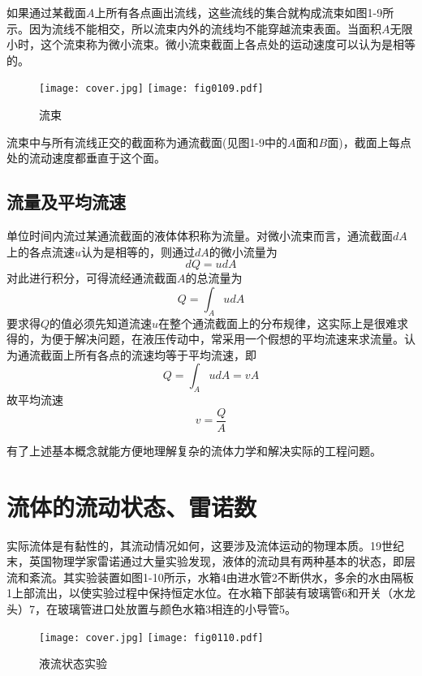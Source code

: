 如果通过某截面$A$上所有各点画出流线，这些流线的集合就构成流束如图1-9所示。因为流线不能相交，所以流束内外的流线均不能穿越流束表面。当面积$A$无限小时，这个流束称为微小流束。微小流束截面上各点处的运动速度可以认为是相等的。

    \begin{figure}[!hbt]
    \centering
    \ifOpenSource
    \texttt{[image: cover.jpg]}
    \else
    \texttt{[image: fig0109.pdf]}
    \fi
    \caption{流束}
    \label{fig:fig0109}
    \end{figure}

流束中与所有流线正交的截面称为通流截面(见图1-9中的$A$面和$B$面)，截面上每点处的流动速度都垂直于这个面。

\subsection{流量及平均流速}
单位时间内流过某通流截面的液体体积称为流量。对微小流束而言，通流截面$dA$上的各点流速$u$认为是相等的，则通过$dA$的微小流量为
$$dQ=udA$$
对此进行积分，可得流经通流截面$A$的总流量为
$$Q=\int_{A}^{}  udA$$
要求得$Q$的值必须先知道流速$u$在整个通流截面上的分布规律，这实际上是很难求得的，为便于解决问题，在液压传动中，常采用一个假想的平均流速来求流量。认为通流截面上所有各点的流速均等于平均流速，即
\begin{equation}
Q=\int_{A}^{}  udA=vA
\end{equation}
故平均流速
\begin{equation}
 v=\frac{Q}{A}
\end{equation}

有了上述基本概念就能方便地理解复杂的流体力学和解决实际的工程问题。
\section{流体的流动状态、雷诺数}
实际流体是有黏性的，其流动情况如何，这要涉及流体运动的物理本质。19世纪末，英国物理学家雷诺通过大量实验发现，液体的流动具有两种基本的状态，即层流和紊流。其实验装置如图1-10所示，水箱4由进水管2不断供水，多余的水由隔板1上部流出，以使实验过程中保持恒定水位。在水箱下部装有玻璃管6和开关（水龙头）7，在玻璃管进口处放置与颜色水箱3相连的小导管5。

\begin{figure}[!hbt]
    \centering
    \ifOpenSource
    \texttt{[image: cover.jpg]}
    \else
    \texttt{[image: fig0110.pdf]}
    \fi
    \caption{液流状态实验}
    \label{fig:fig0110}
    \end{figure}

